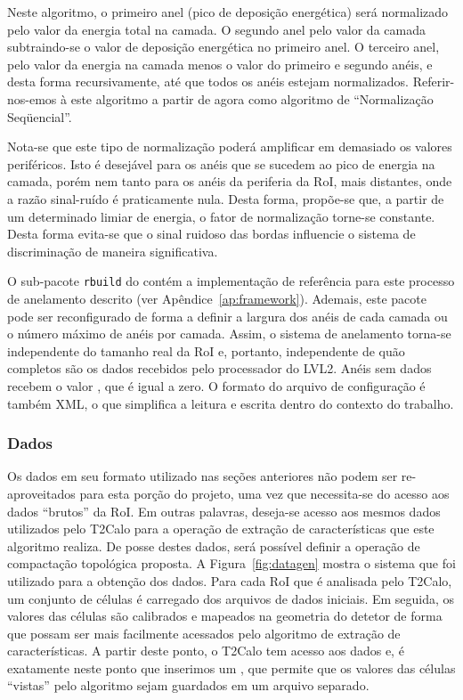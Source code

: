 Neste algoritmo, o primeiro anel (pico de deposição energética) será
normalizado pelo valor da energia total na camada. O segundo anel pelo valor
da camada subtraindo-se o valor de deposição energética no primeiro anel. O
terceiro anel, pelo valor da energia na camada menos o valor do primeiro e
segundo anéis, e desta forma recursivamente, até que todos os anéis estejam
normalizados. Referir-nos-emos à este algoritmo a partir de agora como
algoritmo de ``Normalização Seqüencial''.

Nota-se que este tipo de normalização poderá amplificar em demasiado os
valores periféricos. Isto é desejável para os anéis que se sucedem ao pico de
energia na camada, porém nem tanto para os anéis da periferia da RoI, mais
distantes, onde a razão sinal-ruído é praticamente nula. Desta forma,
propõe-se que, a partir de um determinado limiar de energia, o fator de
normalização torne-se constante. Desta forma evita-se que o sinal ruidoso das
bordas influencie o sistema de discriminação de maneira significativa.

O sub-pacote \texttt{rbuild} do  contém a implementação de
referência para este processo de anelamento descrito (ver
Apêndice~\ref{ap:framework}). Ademais, este pacote pode ser reconfigurado de
forma a definir a largura dos anéis de cada camada ou o número máximo de anéis
por camada. Assim, o sistema de anelamento torna-se independente do tamanho
real da RoI e, portanto, independente de quão completos são os dados recebidos
pelo processador do LVL2. Anéis sem dados recebem o valor , que é
igual a zero. O formato do arquivo de configuração é também XML, o que
simplifica a leitura e escrita dentro do contexto do trabalho.

\subsubsection{Dados}

Os dados em seu formato utilizado nas seções anteriores não podem ser
re-aproveitados para esta porção do projeto, uma vez que necessita-se do
acesso aos dados ``brutos'' da RoI. Em outras palavras, deseja-se acesso aos
mesmos dados utilizados pelo T2Calo para a operação de extração de
características que este algoritmo realiza. De posse destes dados, será
possível definir a operação de compactação topológica proposta. A
Figura~\ref{fig:datagen} mostra o sistema que foi utilizado para a obtenção
dos dados. Para cada RoI que é analisada pelo T2Calo, um conjunto de células é
carregado dos arquivos de dados iniciais. Em seguida, os valores das células
são calibrados e mapeados na geometria do detetor de forma que possam ser mais
facilmente acessados pelo algoritmo de extração de características. A partir
deste ponto, o T2Calo tem acesso aos dados e, é exatamente neste ponto que
inserimos um , que permite que os valores das células ``vistas''
pelo algoritmo sejam guardados em um arquivo separado.

